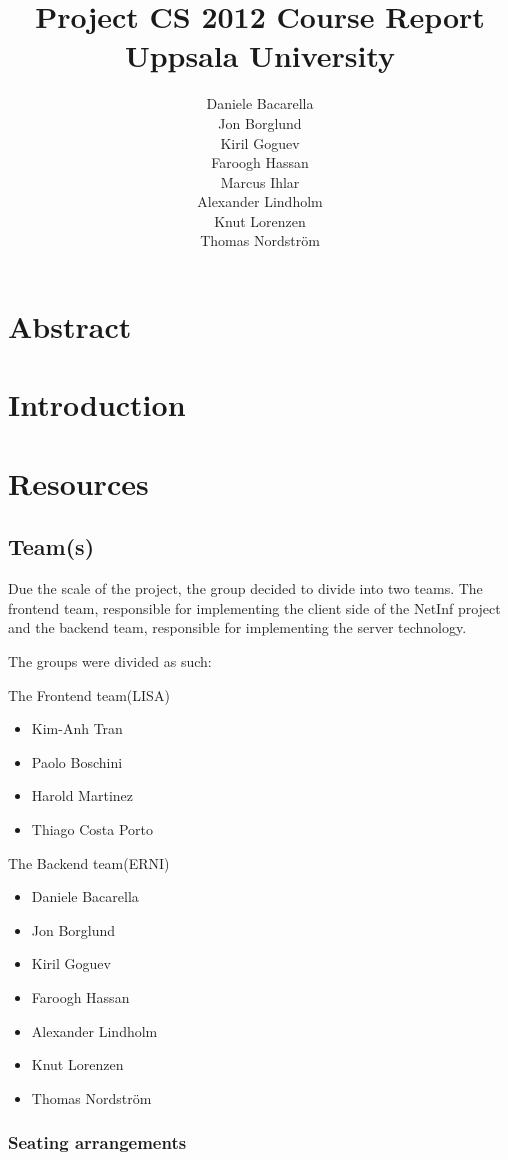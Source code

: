\documentclass[11pt]{report}
\title{Project CS 2012 Course Report\\Uppsala University\\}
\author{Daniele Bacarella\\
Jon Borglund\\
Kiril Goguev\\
		Faroogh Hassan\\
		Marcus Ihlar\\
		Alexander Lindholm\\
		Knut Lorenzen\\
		Thomas Nordstr\"om\\
}
\date{}
\begin{document}
\maketitle

\tableofcontents

\chapter{Abstract}


\chapter{Introduction}

\chapter{Resources}

\section{Team(s)}
Due the scale of the project, the group decided to divide into two teams. The frontend team, responsible for implementing the client side of the NetInf project and the backend team, responsible for implementing the server technology.


The groups were divided as such:

The Frontend team(LISA)
\begin{itemize}
\item Kim-Anh Tran
\item Paolo Boschini
\item Harold Martinez
\item Thiago Costa Porto
\end{itemize}

The Backend team(ERNI) 

\begin {itemize}
\item Daniele Bacarella
\item Jon Borglund
\item Kiril Goguev
\item Faroogh Hassan
\item Alexander Lindholm
\item Knut Lorenzen
\item Thomas Nordstr\"om
\end {itemize}

\subsection{Seating arrangements}
\end{document}
